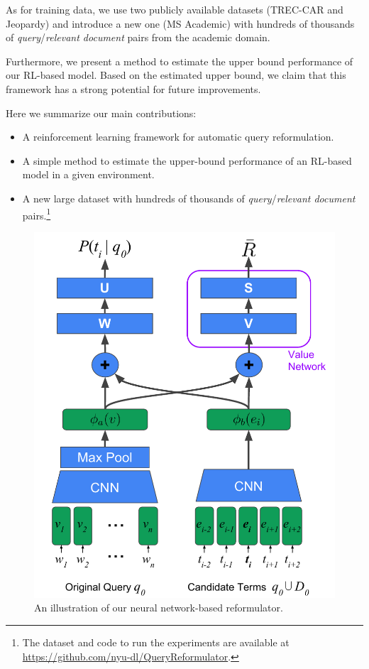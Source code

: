 \documentclass[11pt,letterpaper]{article}
\begin{document}
As for training data, we use two publicly available datasets (TREC-CAR and Jeopardy) and introduce a new one (MS Academic) with hundreds of thousands of \textit{query}/\textit{relevant document} pairs from the academic domain.

Furthermore, we present a method to estimate the upper bound performance of our RL-based model. Based on the estimated upper bound, we claim that this framework has a strong potential for future improvements.


Here we summarize our main contributions:
\begin{itemize}
\setlength\itemsep{1pt}
\item A reinforcement learning framework for automatic query reformulation.
\item A simple method to estimate the upper-bound performance of an RL-based model in a given environment.
\item A new large dataset with hundreds of thousands of \textit{query}/\textit{relevant document} pairs.\footnote{The dataset and code to run the experiments are available at \url{https://github.com/nyu-dl/QueryReformulator}.}
\end{itemize}

\begin{figure}
\begin{center}
\centerline{\includegraphics[width=\columnwidth]{reformulator}}
\caption{An illustration of our neural network-based reformulator.
}
\label{fig:reformulator}
\end{center}

\vskip -4mm
\end{figure} 
\end{document}
